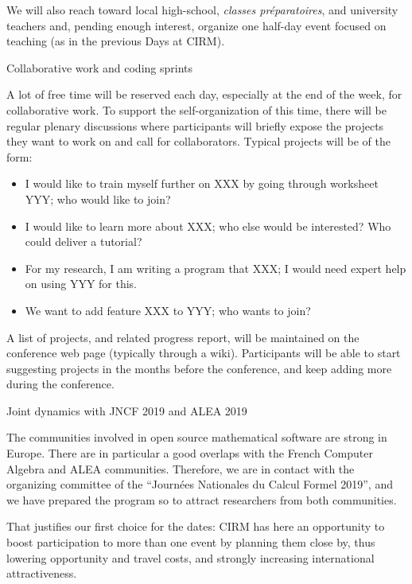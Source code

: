 \documentclass[12pt]{amsart}
\makeatletter
\def\subsection{\@startsection{subsection}{2}%
  \z@{.3\linespacing\@plus.5\linespacing}{.1\linespacing}%
  {\normalfont\bfseries}}
\makeatother
\begin{document}
We will also reach toward local high-school, \textit{classes préparatoires},
and university teachers and, pending enough interest, organize one
half-day event focused on teaching (as in the previous \Sage Days at
CIRM).

\subsection{Collaborative work and coding sprints}

A lot of free time will be reserved each day, especially at the end of
the week, for collaborative work. To support the self-organization of
this time, there will be regular plenary discussions where
participants will briefly expose the projects they want to work on and
call for collaborators. Typical projects will be of the form:
\begin{itemize}
\item I would like to train myself further on XXX by going through
  worksheet YYY; who would like to join?
\item I would like to learn more about XXX; who else would be
  interested? Who could deliver a tutorial?
\item For my research, I am writing a program that XXX; I would need
  expert help on using YYY for this.
\item We want to add feature XXX to YYY; who wants to join?
\end{itemize}

A list of projects, and related progress report, will be maintained on
the conference web page (typically through a wiki). Participants will
be able to start suggesting projects in the months before the conference,
and keep adding more during the conference.

\subsection{Joint dynamics with JNCF 2019 and ALEA 2019}

The communities involved in open source mathematical software are
strong in Europe. There are in particular a good overlaps with the
French Computer Algebra and ALEA communities.  Therefore, we are in
contact with the organizing committee of the ``Journées Nationales du
Calcul Formel 2019'', and we have prepared the program so to attract
researchers from both communities.

That justifies our first choice for the dates: CIRM has here an
opportunity to boost participation to more than one event by planning
them close by, thus lowering opportunity and travel costs, and
strongly increasing international attractiveness.
\end{document}
